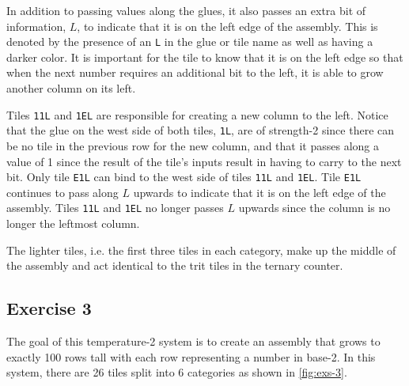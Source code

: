 \documentclass[11pt]{article}
\begin{document}
In addition to passing values along the glues, it also passes an extra bit of information, $L$,
to indicate that it is on the left edge of the assembly. This is denoted by the presence of an
\verb|L| in the glue or tile name as well as having a darker color. It is important for the tile to
know that it is on the left edge so that when the next number requires an additional bit to the
left, it is able to grow another column on its left.

Tiles \verb|11L| and \verb|1EL| are responsible for creating a new column to the left. Notice that
the glue on the west side of both tiles, \verb|1L|, are of strength-2 since there can be no tile in
the previous row for the new column, and that it passes along a value of 1 since the result of the
tile's inputs result in having to carry to the next bit. Only tile \verb|E1L| can bind to the west
side of tiles \verb|11L| and \verb|1EL|. Tile \verb|E1L| continues to pass along $L$ upwards to
indicate that it is on the left edge of the assembly. Tiles \verb|11L| and \verb|1EL| no longer
passes $L$ upwards since the column is no longer the leftmost column.

The lighter tiles, i.e. the first three tiles in each category, make up the middle of the assembly
and act identical to the trit tiles in the ternary counter.

\newpage

\subsection*{Exercise 3}
The goal of this temperature-2 system is to create an assembly that grows to exactly 100 rows tall
with each row representing a number in base-2. In this system, there are 26 tiles split into 6
categories as shown in \cref{fig:exs-3}.
\end{document}
